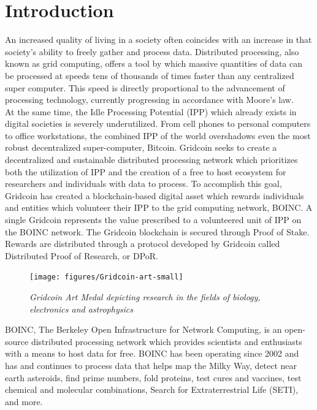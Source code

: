 \section{Introduction}

\label{sec:intro}

An increased quality of living in a society often coincides with an increase in that society’s ability to freely gather and process data.  Distributed processing, also known as grid computing, offers a tool by which massive quantities of data can be processed at speeds tens of thousands of times faster than any centralized super computer.  This speed is directly proportional to the advancement of processing technology, currently progressing in accordance with Moore’s law. \\

At the same time, the Idle Processing Potential (IPP) which already exists in digital societies is severely underutilized.  From cell phones to personal computers to office workstations, the combined IPP of the world overshadows even the most robust decentralized super-computer, Bitcoin.
Gridcoin seeks to create a decentralized and sustainable distributed processing network which prioritizes both the utilization of IPP and the creation of a free to host ecosystem for researchers and individuals with data to process.
To accomplish this goal, Gridcoin has created a blockchain-based digital asset which rewards individuals and entities which volunteer their IPP to the grid computing network, BOINC.  A single Gridcoin represents the value prescribed to a volunteered unit of IPP on the BOINC network.  The Gridcoin blockchain is secured through Proof of Stake.  Rewards are distributed through a protocol developed by Gridcoin called Distributed Proof of Research, or DPoR.\\

\begin{figure}
\centering
\texttt{[image: figures/Gridcoin-art-small]}
\medskip
\caption{\textit{Gridcoin Art Medal depicting research in the fields of biology, electronics and astrophysics}}
\small
\end{figure}


BOINC, The Berkeley Open Infrastructure for Network Computing, is an open-source distributed processing network which provides scientists and enthusiasts with a means to host data for free. BOINC has been operating since 2002 and has and continues to process data that helps map the Milky Way, detect near earth asteroids, find prime numbers, fold proteins, test cures and vaccines, test chemical and molecular combinations, Search for Extraterrestrial Life (SETI), and more.\\

